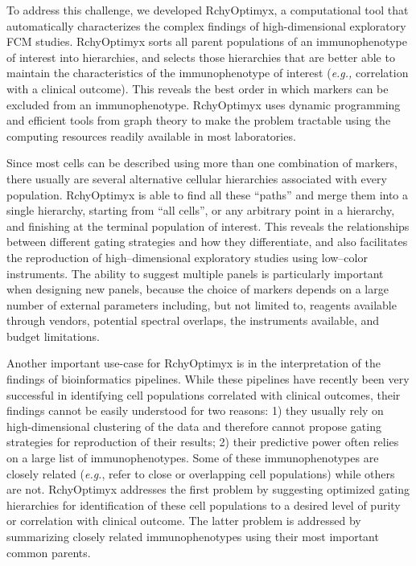 To address this challenge, we  developed RchyOptimyx, a computational tool that automatically characterizes the complex findings of high-dimensional exploratory FCM studies.
RchyOptimyx sorts all parent populations of an immunophenotype of interest into hierarchies, and selects those hierarchies that are better able to maintain the characteristics of the immunophenotype of interest (\emph{e.g.,} correlation with a clinical outcome).
This reveals the best order in which markers can be excluded from an immunophenotype.
RchyOptimyx uses dynamic programming and efficient tools from graph theory to make the problem tractable using the computing resources readily available in most laboratories. 

Since most cells can be described using more than one combination of markers, there usually are several alternative cellular hierarchies associated with every population.
RchyOptimyx is able to find all these ``paths'' and merge them into a single hierarchy, starting from ``all cells'', or any arbitrary point in a hierarchy,  and finishing at the terminal population of interest.
This reveals the relationships between different gating strategies and how they differentiate, and also facilitates the reproduction of high--dimensional exploratory studies using low--color instruments.
The ability to suggest multiple panels is particularly important when designing new panels, because the choice of markers depends on a large number of external parameters including, but not limited to, reagents available through vendors, potential spectral overlaps, the instruments available, and budget limitations.


Another important use-case for RchyOptimyx is in the  interpretation of the findings of bioinformatics pipelines.
While these pipelines have recently been very successful in identifying cell populations correlated with clinical outcomes, their findings cannot be easily understood for two reasons: 1) they usually rely on high-dimensional clustering of the data and therefore cannot propose gating strategies for reproduction of their results; 2) their predictive power often relies on a large list of immunophenotypes. 
Some of these immunophenotypes are closely related (\emph{e.g.}, refer to close or overlapping cell populations) while others are not. 
RchyOptimyx addresses the first problem by suggesting optimized gating hierarchies for identification of these cell populations to a desired level of purity or correlation with clinical outcome. 
The latter problem is addressed by summarizing closely related immunophenotypes using their most important common parents.

